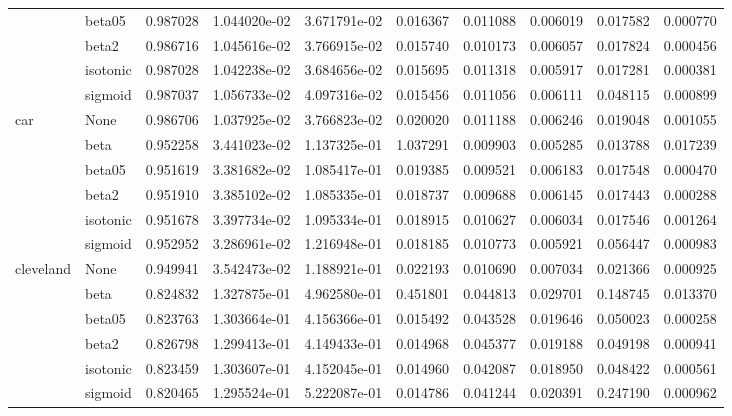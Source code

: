 \begin{tabular}{llrrrrrrrr}
        & beta05 &  0.987028 &  1.044020e-02 &  3.671791e-02 &   0.016367 &  0.011088 &  0.006019 &  0.017582 &  0.000770 \\
        & beta2 &  0.986716 &  1.045616e-02 &  3.766915e-02 &   0.015740 &  0.010173 &  0.006057 &  0.017824 &  0.000456 \\
        & isotonic &  0.987028 &  1.042238e-02 &  3.684656e-02 &   0.015695 &  0.011318 &  0.005917 &  0.017281 &  0.000381 \\
        & sigmoid &  0.987037 &  1.056733e-02 &  4.097316e-02 &   0.015456 &  0.011056 &  0.006111 &  0.048115 &  0.000899 \\
car & None &  0.986706 &  1.037925e-02 &  3.766823e-02 &   0.020020 &  0.011188 &  0.006246 &  0.019048 &  0.001055 \\
        & beta &  0.952258 &  3.441023e-02 &  1.137325e-01 &   1.037291 &  0.009903 &  0.005285 &  0.013788 &  0.017239 \\
        & beta05 &  0.951619 &  3.381682e-02 &  1.085417e-01 &   0.019385 &  0.009521 &  0.006183 &  0.017548 &  0.000470 \\
        & beta2 &  0.951910 &  3.385102e-02 &  1.085335e-01 &   0.018737 &  0.009688 &  0.006145 &  0.017443 &  0.000288 \\
        & isotonic &  0.951678 &  3.397734e-02 &  1.095334e-01 &   0.018915 &  0.010627 &  0.006034 &  0.017546 &  0.001264 \\
        & sigmoid &  0.952952 &  3.286961e-02 &  1.216948e-01 &   0.018185 &  0.010773 &  0.005921 &  0.056447 &  0.000983 \\
cleveland & None &  0.949941 &  3.542473e-02 &  1.188921e-01 &   0.022193 &  0.010690 &  0.007034 &  0.021366 &  0.000925 \\
        & beta &  0.824832 &  1.327875e-01 &  4.962580e-01 &   0.451801 &  0.044813 &  0.029701 &  0.148745 &  0.013370 \\
        & beta05 &  0.823763 &  1.303664e-01 &  4.156366e-01 &   0.015492 &  0.043528 &  0.019646 &  0.050023 &  0.000258 \\
        & beta2 &  0.826798 &  1.299413e-01 &  4.149433e-01 &   0.014968 &  0.045377 &  0.019188 &  0.049198 &  0.000941 \\
        & isotonic &  0.823459 &  1.303607e-01 &  4.152045e-01 &   0.014960 &  0.042087 &  0.018950 &  0.048422 &  0.000561 \\
        & sigmoid &  0.820465 &  1.295524e-01 &  5.222087e-01 &   0.014786 &  0.041244 &  0.020391 &  0.247190 &  0.000962 \\

\end{tabular}
